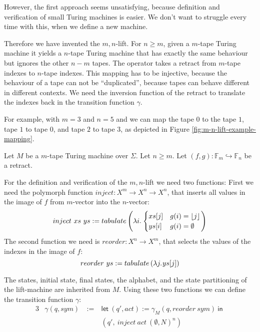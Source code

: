 \documentclass{psartcl}
\newcommand{\lam}[2]{\lambda#1{.}\hskip.7pt#2}
\newcommand{\from}{:}
\renewcommand{\to}{\rightarrow}
\newcommand{\Fin}{\mathbb{F}}
\newcommand{\Some}[1]{\left\lfloor #1\right\rfloor}
\renewcommand{\None}{\emptyset}
\newcommand{\MS}[1]{\textsf{#1}}
\newcommand{\mlet}[2]{\MS{let}~#1~\MS{in}~#2}
\begin{document}
However, the first approach seems unsatisfying, because definition and verification of small Turing machines is easier.  We don't want to struggle
every time with this, when we define a new machine.

Therefore we have invented the $m,n$-lift. For $n \ge m$, given a $m$-tape Turing machine it yields a $n$-tape Turing machine that has exactly the
same behaviour but ignores the other $n-m$ tapes.  The operator takes a retract from $m$-tape indexes to $n$-tape indexes.  This mapping has to be
injective, because the behaviour of a tape can not be ``duplicated'', because tapes can behave different in different contexts.  We need the inversion
function of the retract to translate the indexes back in the transition function $\gamma$.

For example, with $m=3$ and $n=5$ and we can  map the tape $0$ to the tape $1$, tape $1$ to tape $0$, and tape $2$ to tape $3$, as depicted in Figure
\ref{fig:m-n-lift-example-mapping}.


Let $M$ be a $m$-tape Turing machine over $\Sigma$.  Let $n \ge m$.  Let $(f, g) \from \Fin_m \hookrightarrow \Fin_n$ be a retract.

For the definition and verification of the $m,n$-lift we need two functions:  First we need the polymorph function
$inject \from X^m \to X^n \to X^n$, that inserts all values in the image of $f$ from $m$-vector into the $n$-vector:
\begin{align*}
  inject~xs~ys := tabulate \left(\lam i
    \begin{cases}
      xs[j]   & g(i) = \Some{j} \\
      ys[i]   & g(i) = \None
    \end{cases}
  \right)
\end{align*}
The second function we need is $reorder \from X^n \to X^m$, that selects the values of the indexes in the image of $f$:
$$reorder~ys := tabulate \left( \lam j ys[j] \right)$$

The states, initial state, final states, the alphabet, and the state partitioning of the lift-machine are inherited from $M$.  Using these two
functions we can define the transition function $\gamma$:
\begin{alignat*}{3}
  &\gamma (q, sym)  &~:=~& \mlet {(q', act) := \gamma_M(q, reorder~sym)}{\\
  &                 &~  ~& (q',~inject~act~(\None, N)^n)}
\end{alignat*}
\end{document}
